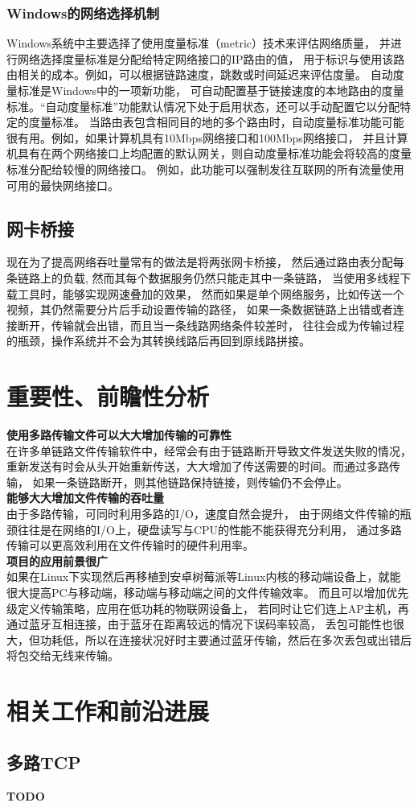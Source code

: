 \documentclass[11pt]{article}
\begin{document}
\subsubsection{Windows的网络选择机制}
Windows系统中主要选择了使用度量标准（metric）技术来评估网络质量，
并进行网络选择度量标准是分配给特定网络接口的IP路由的值，
用于标识与使用该路由相关的成本。例如，可以根据链路速度，跳数或时间延迟来评估度量。
自动度量标准是Windows中的一项新功能，
可自动配置基于链接速度的本地路由的度量标准。“自动度量标准”功能默认情况下处于启用状态，还可以手动配置它以分配特定的度量标准。
当路由表包含相同目的地的多个路由时，自动度量标准功能可能很有用。例如，如果计算机具有10Mbps网络接口和100Mbps网络接口，
并且计算机具有在两个网络接口上均配置的默认网关，则自动度量标准功能会将较高的度量标准分配给较慢的网络接口。
例如，此功能可以强制发往互联网的所有流量使用可用的最快网络接口。
\subsection{网卡桥接}
现在为了提高网络吞吐量常有的做法是将两张网卡桥接，
然后通过路由表分配每条链路上的负载,
然而其每个数据服务仍然只能走其中一条链路，
当使用多线程下载工具时，能够实现网速叠加的效果，
然而如果是单个网络服务，比如传送一个视频，其仍然需要分片后手动设置传输的路径，
如果一条数据链路上出错或者连接断开，传输就会出错，而且当一条线路网络条件较差时，
往往会成为传输过程的瓶颈，操作系统并不会为其转换线路后再回到原线路拼接。
\section{重要性、前瞻性分析}
\textbf{使用多路传输文件可以大大增加传输的可靠性}\\
在许多单链路文件传输软件中，经常会有由于链路断开导致文件发送失败的情况，
重新发送有时会从头开始重新传送，大大增加了传送需要的时间。而通过多路传输，
如果一条链路断开，则其他链路保持链接，则传输仍不会停止。
\\
\textbf{能够大大增加文件传输的吞吐量}\\
由于多路传输，可同时利用多路的I/O，速度自然会提升，
由于网络文件传输的瓶颈往往是在网络的I/O上，硬盘读写与CPU的性能不能获得充分利用，
通过多路传输可以更高效利用在文件传输时的硬件利用率。
\\
\textbf{项目的应用前景很广}\\
如果在Linux下实现然后再移植到安卓树莓派等Linux内核的移动端设备上，就能很大提高PC与移动端，移动端与移动端之间的文件传输效率。
而且可以增加优先级定义传输策略，应用在低功耗的物联网设备上，
若同时让它们连上AP主机，再通过蓝牙互相连接，由于蓝牙在距离较远的情况下误码率较高，
丢包可能性也很大，但功耗低，所以在连接状况好时主要通过蓝牙传输，然后在多次丢包或出错后将包交给无线来传输。
\section{相关工作和前沿进展}
\subsection{多路TCP}
\textbf{TODO}
\end{document}
